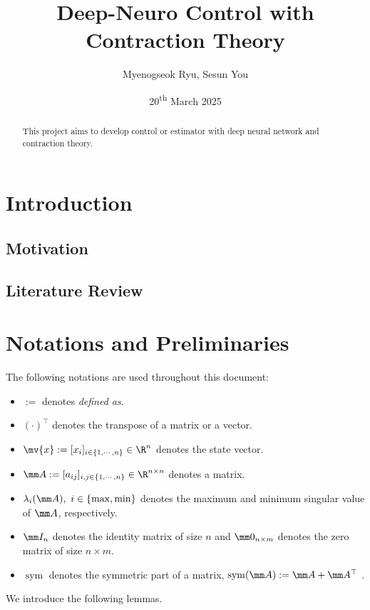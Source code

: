 \documentclass{article}
\title{
    Deep-Neuro Control with Contraction Theory
}
\author{Myenogseok Ryu, Sesun You}
\date{20\textsuperscript{th} March 2025}
\newcommand*{\bdx}{\mv{x}} %
\DeclareMathOperator{\sym}{sym}
\begin{document}
\maketitle

\begin{abstract}
    This project aims to develop control or estimator with deep neural network and contraction theory.
\end{abstract}

\tableofcontents

\section{Introduction}

\subsection{Motivation}

\subsection{Literature Review}

\section{Notations and Preliminaries}

The following notations are used throughout this document:
\begin{itemize}
    \item $:=$ denotes \textit{defined as}.
    \item $(\cdot)^\top$ denotes the transpose of a matrix or a vector.
    \item $\bdx:=[x_i]_{i\in\{1,\cdots,n\}}\in\R^n$ denotes the state vector.
    \item $\mm A:=[a_{ij}]_{i,j\in\{1,\cdots,n\}}\in\R^{n\times n}$ denotes a matrix.
    \item $\lambda_{i}(\mm A),\ i\in\{\max,\min\}$ denotes the maximum and minimum singular value of $\mm A$, respectively.
    \item $\mm I_n$ denotes the identity matrix of size $n$ and $\mm 0_{n\times m}$ denotes the zero matrix of size $n\times m$.
    \item $\sym$ denotes the symmetric part of a matrix, \ie $\sym(\mm A):=\mm A+\mm A^\top$ \cite{Tsukamoto:2021ac}.
\end{itemize}

We introduce the following lemmas.
\end{document}
